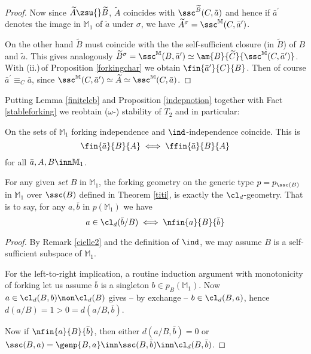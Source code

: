 \begin{proof}
Now since $\widetilde{A}\zsu{}\widetilde{B}$, $\widetilde{A}$ coincides with $\ssc^{\widetilde{B}}(C,\tilde a)$ and hence
if $\bar a^{\prime}$ denotes the image in $\mathbb{M}_{1}$ of $\tilde a$ under $\sigma$, we have
$\widetilde{A}^{\sigma}=\ssc^{\mathbb{M}}(C,\bar a^{\prime})$.

On the other hand $\widetilde{B}$ must coincide with the the self-sufficient closure (in $\widetilde{B}$) of $B$ and $\tilde a$.
This gives analogously
$\widetilde{B}^{\sigma}=\ssc^{\mathbb{M}}(B,\bar a^{\prime})\simeq\am{B}{\widetilde{C}}{\ssc^{\mathbb{M}}(C,\bar a^{\prime})}$.
With (ii.)\,of Proposition \ref{forkingchar} we obtain $\fin{\bar a^{\prime}}{C}{B}$. Then of course $\bar a^{\prime}\equiv_{C}\bar a$, since
$\ssc^{\mathbb{M}}(C,\bar a^{\prime})\simeq\widetilde{A}\simeq\ssc^{\mathbb{M}}(C,\bar a)$.
\end{proof}

\medskip
Putting Lemma \ref{finitelcb} and Proposition \ref{indepnotion} together with Fact \ref{stableforking} we reobtain
($\omega$-) stability of $T_{2}$ and in particular:
\begin{cor}
On the sets of $\mathbb{M}_{1}$ forking independence and $\ind$-independence coincide.
This is $$\fin{\bar a}{B}{A}\iff\ffin{\bar a}{B}{A}$$
for all $\bar a,A,B\inn\mathbb{M}_{1}$.
\end{cor}
\begin{rem*}
For any given {\em set} $B$ in $\mathbb{M}_{1}$, the forking geometry on the generic type $p=p_{\ssc(B)}$ in $\mathbb{M}_{1}$
over $\ssc(B)$ defined
in Theorem \ref{titi}, is exactly the $\cl_{d}$-geometry. 
That is to say, for any $a,\bar b$ in $p(\mathbb{M}_{1}\!)$ we have
$$a\in\cl_{d}(\bar b/B) \iff\nfin{a}{B}{\bar b}$$
\end{rem*}
\begin{proof}
By Remark \ref{cielle2} and the definition of $\ind$, we may assume $B$ is a self-sufficient subspace of $\mathbb{M}_{1}$.

For the left-to-right implication, a routine induction argument with monotonicity of forking let us assume $\bar b$ is a singleton $b\in p_{B}(\mathbb{M}_{1})$. Now $a\in\cl_{d}(B,b)\non\cl_{d}(B)$ gives -- by exchange -- $b\in\cl_{d}(B,a)$, hence
$d(a/B)=1>0=d(a/B,\bar b)$.

\medskip
Now if $\nfin{a}{B}{\bar b}$, then either $d(a/B,\bar b)=0$ or $\ssc(B,a)=\genp{B,a}\inn\ssc(B,\bar b)\inn\cl_{d}(B,\bar b)$.
\end{proof}